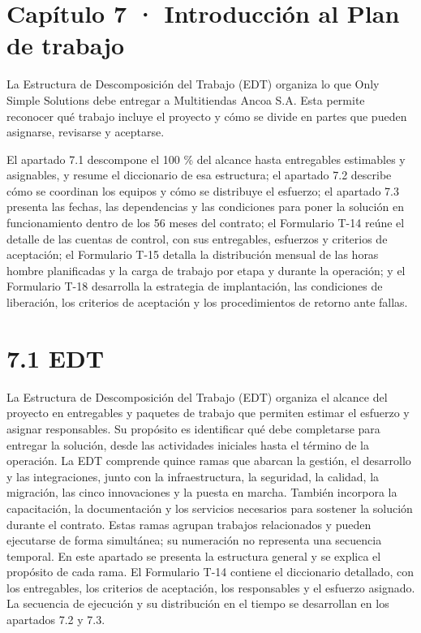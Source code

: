 \documentclass[11pt]{article}
\begin{document}
\renewcommand{\tablename}{Tabla}
\renewcommand{\figurename}{Figura}
\renewcommand{\thefigure}{7.\arabic{figure}}
\renewcommand{\thetable}{7.\arabic{table}}

\tableofcontents
\clearpage

\section{Capítulo 7 · Introducción al Plan de trabajo}\label{capuxedtulo-7-introducciuxf3n-al-plan-de-trabajo}

La Estructura de Descomposición del Trabajo (EDT) organiza lo que Only Simple Solutions debe entregar a Multitiendas Ancoa S.A. Esta permite reconocer qué trabajo incluye el proyecto y cómo se divide en partes que pueden asignarse, revisarse y aceptarse.

El apartado 7.1 descompone el 100 \% del alcance hasta entregables estimables y asignables, y resume el diccionario de esa estructura; el apartado 7.2 describe cómo se coordinan los equipos y cómo  se distribuye el esfuerzo; el apartado 7.3 presenta las fechas, las dependencias y las condiciones para poner la solución en funcionamiento dentro de los 56 meses del contrato; el Formulario T-14 reúne el detalle de las cuentas de control, con sus entregables, esfuerzos y criterios de aceptación; el Formulario T-15 detalla la distribución mensual de las horas hombre planificadas y la carga de trabajo por etapa y durante la operación; y el Formulario T-18 desarrolla la estrategia de implantación, las condiciones de liberación, los criterios de aceptación y los procedimientos de retorno ante fallas.

\section{7.1 EDT}\label{edt}

La Estructura de Descomposición del Trabajo (EDT) organiza el alcance del proyecto en entregables y paquetes de trabajo que permiten estimar el esfuerzo y asignar responsables. Su propósito es identificar qué debe completarse para entregar la solución, desde las actividades iniciales hasta el término de la operación.
La EDT comprende quince ramas que abarcan la gestión, el desarrollo y las integraciones, junto con la infraestructura, la seguridad, la calidad, la migración, las cinco innovaciones y la puesta en marcha. También incorpora la capacitación, la documentación y los servicios necesarios para sostener la solución durante el contrato. Estas ramas agrupan trabajos relacionados y pueden ejecutarse de forma simultánea; su numeración no representa una secuencia temporal.
En este apartado se presenta la estructura general y se explica el propósito de cada rama. El Formulario T-14 contiene el diccionario detallado, con los entregables, los criterios de aceptación, los responsables y el esfuerzo asignado. La secuencia de ejecución y su distribución en el tiempo se desarrollan en los apartados 7.2 y 7.3.
\end{document}
